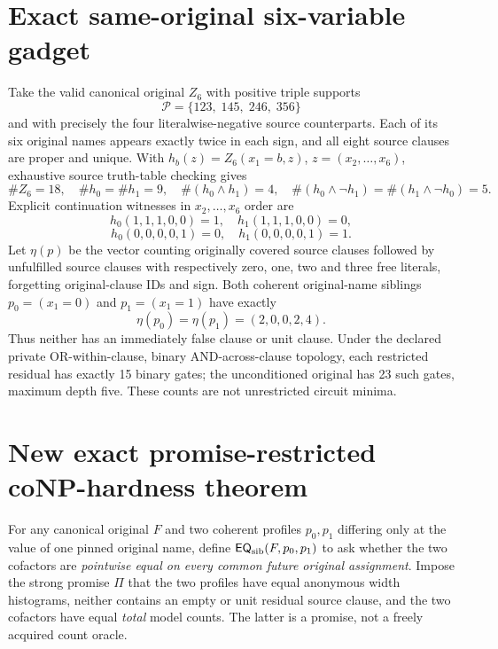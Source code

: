 \documentclass[11pt]{article}
\begin{document}
\section{Exact same-original six-variable gadget}
Take the valid canonical original $Z_6$ with positive triple supports
\[
\mathcal P=\{123,\;145,\;246,\;356\}
\]
and with precisely the four literalwise-negative source counterparts. Each of its six original names appears exactly twice in each sign, and all eight source clauses are proper and unique. With $h_b(z)=Z_6(x_1=b,z)$, $z=(x_2,\ldots,x_6)$, exhaustive source truth-table checking gives
\[
\#Z_6=18,\quad \#h_0=\#h_1=9,\quad
\#(h_0\land h_1)=4,\quad
\#(h_0\land\neg h_1)=\#(h_1\land\neg h_0)=5.
\tag{1}
\]
Explicit continuation witnesses in $x_2,\ldots,x_6$ order are
\[
h_0(1,1,1,0,0)=1,\quad h_1(1,1,1,0,0)=0,
\]
\[
h_0(0,0,0,0,1)=0,\quad h_1(0,0,0,0,1)=1.
\tag{2}
\]
Let $\eta(p)$ be the vector counting originally covered source clauses followed by unfulfilled source clauses with respectively zero, one, two and three free literals, forgetting original-clause IDs and sign. Both coherent original-name siblings $p_0=(x_1=0)$ and $p_1=(x_1=1)$ have exactly
\[
\eta(p_0)=\eta(p_1)=(2,0,0,2,4).
\tag{3}
\]
Thus neither has an immediately false clause or unit clause. Under the declared private OR-within-clause, binary AND-across-clause topology, each restricted residual has exactly 15 binary gates; the unconditioned original has 23 such gates, maximum depth five. These counts are not unrestricted circuit minima.

\section{New exact promise-restricted coNP-hardness theorem}
For any canonical original $F$ and two coherent profiles $p_0,p_1$ differing only at the value of one pinned original name, define $\mathsf{EQ}_{\rm sib}(F,p_0,p_1)$ to ask whether the two cofactors are \emph{pointwise equal on every common future original assignment}. Impose the strong promise $\Pi$ that the two profiles have equal anonymous width histograms, neither contains an empty or unit residual source clause, and the two cofactors have equal \emph{total} model counts. The latter is a promise, not a freely acquired count oracle.
\end{document}
